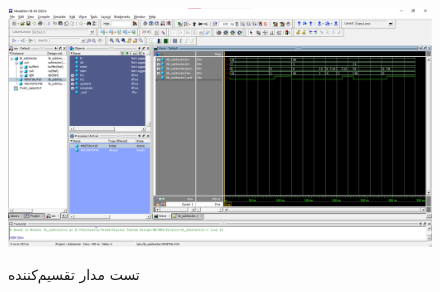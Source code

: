 \documentclass{article}
\begin{document}
\begin{figure}[!htbp]
    \centering
    \includegraphics[width=\linewidth]{ModelSim.png}
    \label{tb}
    \caption{تست مدار تقسیم‌کننده}
\end{figure}
\end{document}
